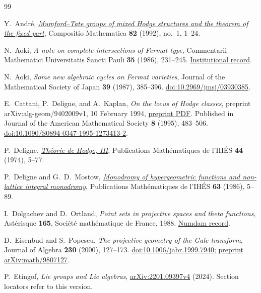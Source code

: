\documentclass[11pt]{article}
\theoremstyle{plain}
\theoremstyle{definition}
\theoremstyle{remark}
\numberwithin{equation}{section}
\begin{document}
\begin{thebibliography}{99}

Y.~Andr\'e,
\href{https://www.numdam.org/article/CM_1992__82_1_1_0.pdf}{\emph{Mumford--Tate groups of mixed Hodge structures and the theorem of the fixed part}},
Compositio Mathematica \textbf{82} (1992), no.~1, 1--24.

N.~Aoki,
\emph{A note on complete intersections of Fermat type},
Commentarii Mathematici Universitatis Sancti Pauli
\textbf{35} (1986), 231--245.
\href{https://rikkyo.repo.nii.ac.jp/records/10098}{Institutional record}.

N.~Aoki,
\emph{Some new algebraic cycles on Fermat varieties},
Journal of the Mathematical Society of Japan \textbf{39} (1987),
385--396.
\href{https://doi.org/10.2969/jmsj/03930385}{doi:10.2969/jmsj/03930385}.

E.~Cattani, P.~Deligne, and A.~Kaplan,
\emph{On the locus of Hodge classes},
preprint arXiv:alg-geom/9402009v1, 10 February 1994,
\href{https://publications.ias.edu/sites/default/files/70_LocusHodgeClasses.pdf}{preprint PDF}.
Published in
Journal of the American Mathematical Society \textbf{8} (1995),
483--506.
\href{https://doi.org/10.1090/S0894-0347-1995-1273413-2}{doi:10.1090/S0894-0347-1995-1273413-2}.

P.~Deligne,
\href{https://doi.org/10.1007/BF02685881}{\emph{Th\'eorie de Hodge, III}},
Publications Math\'ematiques de l'IH\'ES \textbf{44} (1974), 5--77.

P.~Deligne and G.~D.~Mostow,
\href{https://doi.org/10.1007/BF02831622}{\emph{Monodromy of hypergeometric functions and non-lattice integral monodromy}},
Publications Math\'ematiques de l'IH\'ES \textbf{63} (1986), 5--89.

I.~Dolgachev and D.~Ortland,
\emph{Point sets in projective spaces and theta functions},
Ast\'erisque \textbf{165}, Soci\'et\'e math\'ematique de France, 1988.
\href{https://www.numdam.org/item/AST_1988__165__1_0/}{Numdam record}.

D.~Eisenbud and S.~Popescu,
\emph{The projective geometry of the Gale transform},
Journal of Algebra \textbf{230} (2000), 127--173.
\href{https://doi.org/10.1006/jabr.1999.7940}{doi:10.1006/jabr.1999.7940};
\href{https://arxiv.org/pdf/math/9807127}{preprint arXiv:math/9807127}.

P.~Etingof,
\emph{Lie groups and Lie algebras},
\href{https://arxiv.org/abs/2201.09397v4}{arXiv:2201.09397v4} (2024).
Section locators refer to this version.


\end{thebibliography}
\end{document}
